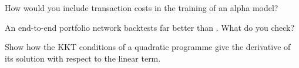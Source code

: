\begin{interviewq}\label{iq:ml:from-prediction-to-portfolio:4}
How would you include transaction costs in the training of an alpha model?
\end{interviewq}

\begin{interviewq}\label{iq:ml:from-prediction-to-portfolio:5}
An end-to-end portfolio network backtests far better than . What do you check?
\end{interviewq}

\begin{interviewq}\label{iq:ml:from-prediction-to-portfolio:6}
Show how the KKT conditions of a quadratic programme give the derivative of its solution with respect to the linear term.
\end{interviewq}
